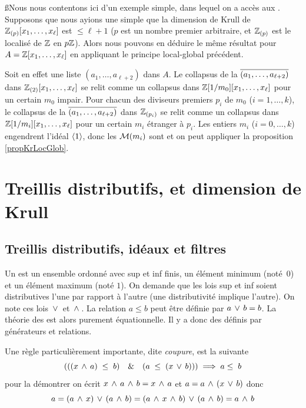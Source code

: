\ss Nous nous contentons ici d'un exemple simple, dans lequel on a accès 
aux \ideps.
Supposons que nous ayions une \prco simple
que la dimension de Krull de $\mathbb{Z}_{(p)}[x_1,\ldots,x_\ell]$ est 
 $\leq\ell+1$ 
($p$ est un nombre premier arbitraire, et $\mathbb{Z}_{(p)}$ est le localisé de 
$\mathbb{Z}$ en $p\mathbb{Z}$). Alors nous pouvons en déduire le même résultat pour 
 $A=\mathbb{Z}[x_1,\ldots,x_\ell]$ en appliquant le principe local-global 
précédent.

Soit en effet une liste $(a_1,\ldots,a_{\ell+2})$ dans $A$. Le collapsus 
de la \proel $\overline{(a_1,\ldots,a_{\ell+2})}$ dans
$\mathbb{Z}_{(2)}[x_1,\ldots,x_\ell]$ se relit comme un collapsus  dans
$\mathbb{Z}[1/m_0][x_1,\ldots,x_\ell]$ pour un certain $m_0$ impair.
Pour chacun des diviseurs premiers $p_i$ de $m_0$ ($i=1,\ldots,k$), le 
collapsus de la \proel $\overline{(a_1,\ldots,a_{\ell+2})}$ dans
$\mathbb{Z}_{(p_i)}$ se relit comme un collapsus  dans
$\mathbb{Z}[1/m_i][x_1,\ldots,x_\ell]$ pour un certain $m_i$ étranger à $p_i$.
Les entiers $m_i$ ($i=0,\ldots,k$) engendrent l'idéal $\left\langle{1}\right\rangle$, donc 
les \mos ${\cal M}(m_i)$ sont \com et on peut appliquer la proposition
\ref{propKrLocGlob}.




\section{Treillis  distributifs, \entrels et dimension de Krull}
\label{secKrullTreil}
\subsection{Treillis  distributifs, idéaux et filtres}
\label{subsecTrd1}
Un \trdi est un ensemble ordonné avec sup et inf finis, un élément
minimum (noté~$0$) et un élément maximum
(noté $1$). On demande que les lois sup et inf soient distributives
l'une par rapport à l'autre (une distributivité implique l'autre). On
note  ces lois $\,\vee\,$ et $\,\wedge\,$.
La relation $a\leq b$  peut être définie par $a\,\vee\, b=b$. La
théorie des \trdis est alors purement équationnelle.
Il y a donc des \trdis définis par générateurs et relations.

Une règle particulièrement importante, dite {\em coupure}, est la
suivante
$$ \left( ((x\,\wedge\, a)\; \leq\;  b)\quad\&\quad  (a\; \leq\; (x\,\vee\,  b))
\right)\; \Longrightarrow \; a \leq\;  b
$$
pour la démontrer on écrit $ x\,\wedge\, a\,\wedge\, b=x\,\wedge\, a$  et
$a= a\,\wedge\,(x\,\vee\, b)$ donc
$$ a=(a\,\wedge\, x)\,\vee\,(a\,\wedge\, b)=(a\,\wedge\, x\,\wedge\, b)\,\vee\,(a\,\wedge\, b)=a\,\wedge\, b
$$

